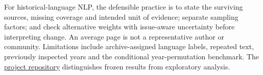 \documentclass[10pt,letterpaper]{article}
\begin{document}
For historical-language NLP, the defensible practice is to state the surviving sources, missing coverage and intended unit of evidence; separate sampling factors; and check alternative weights with issue-aware uncertainty before interpreting change. An average page is not a representative author or community. Limitations include archive-assigned language labels, repeated text, previously inspected years and the conditional year-permutation benchmark. The \href{https://github.com/Stralb/isixhosa-archive-nlp}{project repository} distinguishes frozen results from exploratory analysis.

\clearpage

\setlength{\bibleftmargin}{.125in}
\setlength{\bibindent}{-\bibleftmargin}


\clearpage
\onecolumn

\clearpage
\twocolumn


\end{document}
